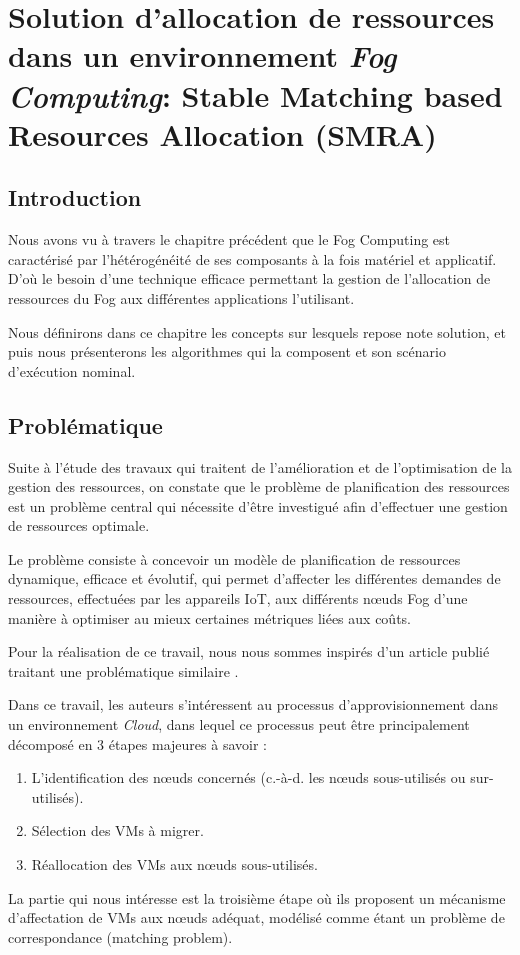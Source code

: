 \chapter{Solution d'allocation de ressources dans un environnement \emph{Fog Computing}: Stable Matching based Resources Allocation (SMRA)}
\thispagestyle{fancy}
\section{Introduction}
Nous avons vu à travers le chapitre précédent que le Fog Computing est caractérisé par l'hétérogénéité de ses composants à la fois matériel et applicatif. D'où le besoin d'une technique efficace permettant la gestion de l'allocation de ressources du Fog aux différentes applications l'utilisant.\par
Nous définirons dans ce chapitre les concepts sur lesquels repose note solution, et puis nous présenterons les algorithmes qui la composent et son scénario d'exécution nominal.



\section{Problématique}
Suite à l'étude des travaux qui traitent de l'amélioration et de l'optimisation de la gestion des ressources, on constate que le problème de planification des ressources est un problème central qui nécessite d'être investigué afin d'effectuer une gestion de ressources optimale.\par
Le problème consiste à concevoir un modèle de planification de ressources dynamique, efficace et évolutif, qui permet d'affecter les différentes demandes de ressources, effectuées par les appareils IoT, aux différents nœuds Fog d'une manière à optimiser au mieux certaines métriques liées aux coûts.\par
Pour la réalisation de ce travail, nous nous sommes inspirés d'un article publié traitant une problématique similaire \cite{jing2016}.\par
Dans ce travail, les auteurs s'intéressent au processus d'approvisionnement dans un environnement \emph{Cloud}, dans lequel ce processus peut être principalement décomposé en 3 étapes majeures à savoir : 
\begin{enumerate}
    \item L'identification des nœuds concernés (c.-à-d. les nœuds sous-utilisés ou sur-utilisés). 
    \item Sélection des VMs à migrer.
    \item Réallocation des VMs aux nœuds sous-utilisés.
\end{enumerate}
\par
La partie qui nous intéresse est la troisième étape où ils proposent un mécanisme d'affectation de VMs aux nœuds adéquat, modélisé comme étant un problème de correspondance (matching problem).



